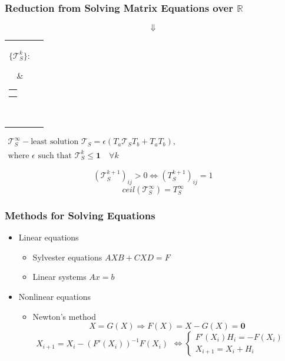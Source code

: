 \documentclass[aspectratio=169,xcolor=table]{beamer}
\begin{document}
\begin{frame}[fragile]
  \transwipe[direction=90]
  \frametitle{Reduction from Solving Matrix Equations over $\mathbb{R}$}
  
    $$\Downarrow$$
    \centering
    \begin{tabular}{cl}
    \parbox{0.07\linewidth}{
    $\{ \mathcal{T}_S^k \}:$
    }
    & \begin{tabular}{l}
    $\mathcal{T}_S^0 = \mathbf{0}$ \\
    $\mathcal{T}_S^{k+1} = \epsilon(T_a \mathcal{T}_S^k T_b + T_a T_b)$
    \end{tabular} \\
    \end{tabular}

    \vspace{20pt}
    \(
    \left.
    \begin{array}{c}
    \mathcal{T}_S^{\infty} - \text{least solution } \mathcal{T}_S = \epsilon(T_a \mathcal{T}_S T_b + T_a T_b), \\
    \text{where } \epsilon \text{ such that } \mathcal{T}_{S}^{k} \leq \textbf{1} \quad \forall k
    \end{array}
    \right.
    \)
  
  \pause
  
  $$(\mathcal{T}_S^{k+1})_{ij} > 0 \iff (T_S^{k+1})_{ij} = 1$$
  $$ceil(\mathcal{T}_S^{\infty}) = T_S^{\infty}$$
\end{frame}

\begin{frame}[fragile]
  \transwipe[direction=90]
  \frametitle{Methods for Solving Equations}
 
\begin{itemize}
    \item Linear equations
    \begin{itemize}
        \item Sylvester equations $AXB + CXD = F$
        \item Linear systems $Ax=b$
    \end{itemize}
    \item Nonlinear equations
    \begin{itemize}
        \item Newton's method \\
                $$X = G(X) \Rightarrow F(X) = X - G(X) = \mathbf{0}$$
                \(
                \left.
                \begin{array}{l}
                X_{i+1} = X_i - (F'(X_i))^{-1}F(X_i)
                \end{array}
                \right.
                \iff
                \left\{
                \begin{array}{l}
                F'(X_i)H_i = - F(X_i) \\
                X_{i+1} = X_i + H_i
                \end{array}
                \right.
                \)
    \end{itemize}
\end{itemize}
\end{frame}
\end{document}
